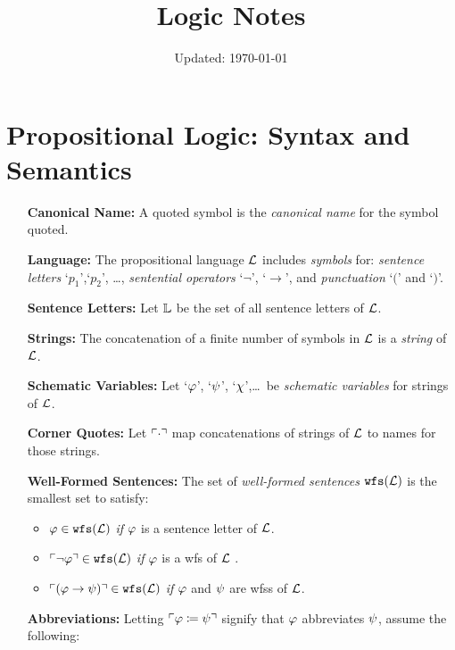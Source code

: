 \documentclass[a4paper, 11pt]{article} %
\title{Logic Notes}  %
\date{Updated: \today}                              %
\begin{document}
\maketitle %
\thispagestyle{empty}



\section*{\sc Propositional Logic: Syntax and Semantics}

\begin{enumerate}[leftmargin=1.2in] %
	\item[\bf Canonical Name:] A quoted symbol is the \textit{canonical name} for the symbol quoted.
	\item[\bf Language:] The propositional language $\mathcal{L}$ includes \textit{symbols} for: \textit{sentence letters} `$p_1$',`$p_2$', \dots, \textit{sentential operators} `$\neg$', `$\rightarrow$', and \textit{punctuation} `$($' and `$)$'.
  \item[\bf Sentence Letters:] Let $\mathbb{L}$ be the set of all sentence letters of $\mathcal{L}$.
	\item[\bf Strings:] The concatenation of a finite number of symbols in $\mathcal{L}$ is a \textit{string} of $\mathcal{L}$.
	\item[\bf Schematic Variables:] Let `$\varphi$', `$\psi$', `$\chi$',\ldots\ be \textit{schematic variables} for strings of $\mathcal{L}$.
	\item[\bf Corner Quotes:] Let $\ulcorner\cdot\urcorner$ map concatenations of strings of $\mathcal{L}$ to names for those strings.
	\item[\bf Well-Formed Sentences:] The set of \textit{well-formed sentences} $\texttt{wfs}(\mathcal{L})$ is the smallest set to satisfy:
	      \begin{itemize}\small
		      \item $\varphi \in \texttt{wfs}(\mathcal{L})$ \textit{if} $\varphi$ is a sentence letter of $\mathcal{L}$.
		      \item $\ulcorner\neg \varphi\urcorner \in \texttt{wfs}(\mathcal{L})$ \textit{if} $\varphi$ is a wfs of $\mathcal{L}$ .
		      \item $\ulcorner(\varphi \rightarrow \psi)\urcorner \in \texttt{wfs}(\mathcal{L})$ \textit{if} $\varphi$ and $\psi$ are wfss of $\mathcal{L}$.
	      \end{itemize}
	\item[\bf Abbreviations:] Letting $\ulcorner\varphi \coloneq \psi\urcorner$ signify that $\varphi$ abbreviates $\psi$, assume the following:

\end{enumerate}
\end{document}
